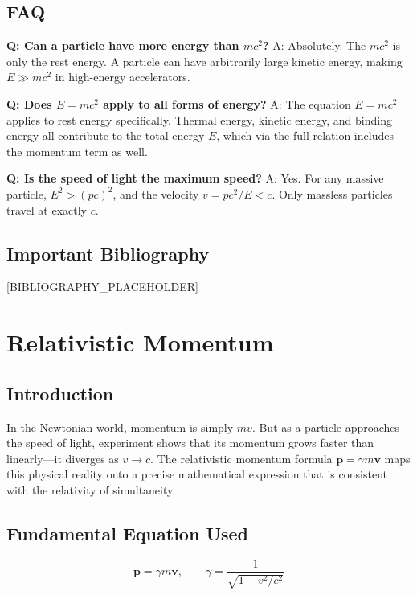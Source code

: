 \documentclass[11pt,openright]{book}
\begin{document}
\section*{FAQ}

\textbf{Q: Can a particle have more energy than $mc^2$?}
A: Absolutely. The $mc^2$ is only the rest energy. A particle can have arbitrarily large kinetic energy, making $E \gg mc^2$ in high-energy accelerators.

\textbf{Q: Does $E = mc^2$ apply to all forms of energy?}
A: The equation $E = mc^2$ applies to rest energy specifically. Thermal energy, kinetic energy, and binding energy all contribute to the total energy $E$, which via the full relation includes the momentum term as well.

\textbf{Q: Is the speed of light the maximum speed?}
A: Yes. For any massive particle, $E^2 > (pc)^2$, and the velocity $v = pc^2/E < c$. Only massless particles travel at exactly $c$.
\section*{Important Bibliography}

[BIBLIOGRAPHY_PLACEHOLDER]


\chapter{Relativistic Momentum}

\section*{Introduction}

In the Newtonian world, momentum is simply $mv$. But as a particle approaches the speed of light, experiment shows that its momentum grows faster than linearly---it diverges as $v \to c$. The relativistic momentum formula $\mathbf{p} = \gamma m\mathbf{v}$ maps this physical reality onto a precise mathematical expression that is consistent with the relativity of simultaneity.
\section*{Fundamental Equation Used}

\begin{equation}
\mathbf{p} = \gamma m \mathbf{v}, \qquad \gamma = \frac{1}{\sqrt{1 - v^2/c^2}}
\end{equation}
\end{document}
